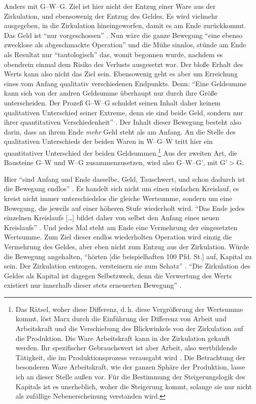 \documentclass[12pt,
               DIV13,
               paper=a4,
               twoside=false,
               onehalfspacing,
               bibliography=totoc,
               toc=graduated,
               draft,
               ]{scrartcl}
\newcommand{\lips}{\dots\unkern}
\newcommand{\pc}[2]{\parencite[#1]{#2}}
\newcommand{\vgl}[2]{\parencite[vgl.][#1]{#2}}
\newcommand{\worries}[1]{\ifdraft{\textcolor{blue}{\texttt{(#1)}}}{}}
\newcommand{\gwg}{G--W--G'\xspace}
\newcommand{\wgw}{W--G--W\xspace}
\begin{document}

Anders mit G--W--G. Ziel ist hier nicht der Entzug einer Ware aus der
Zirkulation, und ebensowenig der Entzug des Geldes. Es wird vielmehr
ausgegeben, in die Zirkulation hineingeworfen, damit es am Ende
zurückkommt. Das Geld ist "`nur vorgeschossen"' \pc{163}{kap}. Nun
wäre die ganze Bewegung "`eine ebenso zwecklose als abgeschmackte
Operation"' \pc{165}{kap} und die Mühe sinnlos, stünde am Ende als
Resultat nur "`tautologisch"' \pc{164}{kap} das, womit begonnen wurde,
nachdem es obendrein einmal dem Risiko des Verlusts ausgesetzt war.
Der bloße Erhalt des Werts kann also nicht das Ziel sein. Ebensowenig
geht es aber um Erreichung eines vom Anfang qualitativ verschiedenen
Endpunkts. Denn: "`Eine Geldsumme kann sich von der andren Geldsumme
überhaupt nur durch ihre Größe unterscheiden. Der Prozeß G--W--G
schuldet seinen Inhalt daher keinem qualitativen Unterschied seiner
Extreme, denn sie sind beide Geld, sondern nur ihrer quantitativen
Verschiedenheit"' \pc{165}{kap}. Der Inhalt dieser Bewegung besteht
also darin, dass an ihrem Ende \emph{mehr} Geld steht als am Anfang.
An die Stelle des qualitativen Unterschieds der beiden Waren in \wgw
tritt hier ein quantitativer Unterschied der beiden
Geldsummen.\footnote{Das Rätsel, woher diese Differenz, d.\,h. diese
Vergrößerung der Wertsumme kommt, löst Marx durch die Einführung der
Differenz von Arbeit und Arbeitskraft und die Verschiebung des
Blickwinkels von der Zirkulation auf die Produktion. Die Ware
Arbeitskraft kann in der Zirkulation gekauft werden. Ihr spezifischer
Gebrauchswert ist aber Arbeit, also wertbildende Tätigkeit, die im
Produktionsprozess verausgabt wird \vgl{xx}{kap}. Die Betrachtung der
besonderen Ware Arbeitskraft, wie der ganzen Sphäre der Produktion,
lasse ich an dieser Stelle außen vor. Für die Bestimmung der
Steigerungslogik des Kapitals ist es unerheblich, woher die Steigerung
kommt, solange sie nur nicht als zufällige Nebenerscheinung verstanden
wird.\worries{?}} Aus der zweiten Art, die Bausteine G--W und W--G
zusammenzusetzen, wird also \gwg, mit G'$>$G.


Hier "`sind Anfang und Ende dasselbe, Geld, Tauschwert, und schon
dadurch ist die Bewegung endlos"' \pc{166}{kap}. Es handelt sich nicht
um einen einfachen Kreislauf, es kreist nicht immer unterschiedslos
die gleiche Wertsumme, sondern um eine Bewegung, die jeweils auf einer
höheren Stufe wiederholt wird. "`Das Ende jedes einzelnen Kreislaufs
[\lips] bildet daher von selbst den Anfang eines neuen Kreislaufs"'
\pc{S. 166 f.}{kap}. Und jedes Mal steht am Ende eine Vermehrung der
eingesetzten Wertsumme. Zum Ziel dieser endlos wiederholten Operation
wird einzig die Vermehrung des Geldes, aber eben nicht zum Entzug aus
der Zirkulation. Würde die Bewegung angehalten, "`hörten [die
beispielhaften 100 Pfd. St.] auf, Kapital zu sein. Der Zirkulation
entzogen, versteinern sie zum Schatz"' \pc{166}{kap}. "`Die
Zirkulation des Geldes als Kapital ist dagegen Selbstzweck, denn die
Verwertung des Werts existiert nur innerhalb dieser stets erneuerten
Bewegung"' \pc{167}{kap}.
\end{document}
